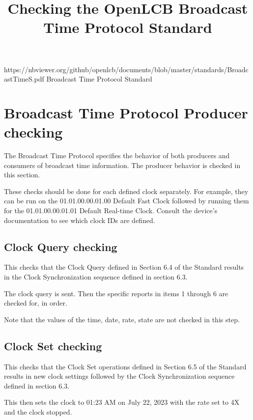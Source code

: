 

\title{Checking the OpenLCB Broadcast Time Protocol Standard}


\maketitle


\introductionCaveats
    {https://nbviewer.org/github/openlcb/documents/blob/master/standards/BroadcastTimeS.pdf}
    {Broadcast Time Protocol Standard}

\section{Broadcast Time Protocol Producer checking}

The Broadcast Time Protocol specifies the behavior of both producers and consumers of 
broadcast time information.  
The producer behavior is checked in this section.

These checks should be done for each defined clock separately. 
For example, they can be run on the 01.01.00.00.01.00 Default Fast Clock
followed by running them for the 01.01.00.00.01.01 Default Real-time Clock.
Consult the device's documentation to see which clock IDs are defined.


\subsection{Clock Query checking}

This checks that the Clock Query defined in Section 6.4 of the Standard results in the
Clock Synchronization sequence defined in section 6.3.

The clock query is sent. 
Then the specific reports in items 1 through 6 are checked for, in order.

Note that the values of the time, date, rate, state are not checked in this step.

\subsection{Clock Set checking}

This checks that the Clock Set operations defined in Section 6.5 of the Standard results 
in new clock settings followed by the
Clock Synchronization sequence defined in section 6.3.

This then sets the clock to 01:23 AM on July 22, 2023 with the rate set to 4X and the clock stopped.

